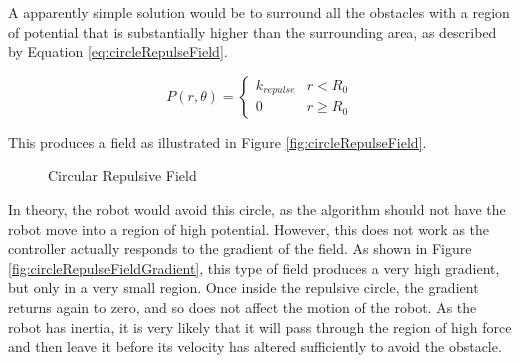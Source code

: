 \documentclass[10pt]{article}
\begin{document}
A apparently simple solution would be to surround all the obstacles with a
region of potential that is substantially higher than the surrounding area, as
described by Equation \ref{eq:circleRepulseField}.

\begin{equation}
P\left(r,\theta\right)=\begin{cases}
k_{repulse} & r<R_{0}\\
0 & r\geq R_{0}
\end{cases}\label{eq:circleRepulseField}
\end{equation}

This produces a field as illustrated in Figure \ref{fig:circleRepulseField}.

\begin{figure}
 \centering
 \caption{Circular Repulsive Field}
\end{figure}

In theory, the robot would avoid this circle, as the algorithm should not have
the robot move into a region of high potential. However, this does not work as
the controller actually responds to the gradient of the field. As shown in
Figure \ref{fig:circleRepulseFieldGradient}, this type of field produces a very
high gradient, but only in a very small region. Once inside the repulsive
circle, the gradient returns again to zero, and so does not affect the motion of
the robot. As the robot has inertia, it is very likely that it will pass through
the region of high force and then leave it before its velocity has altered
sufficiently to avoid the obstacle.
\end{document}
